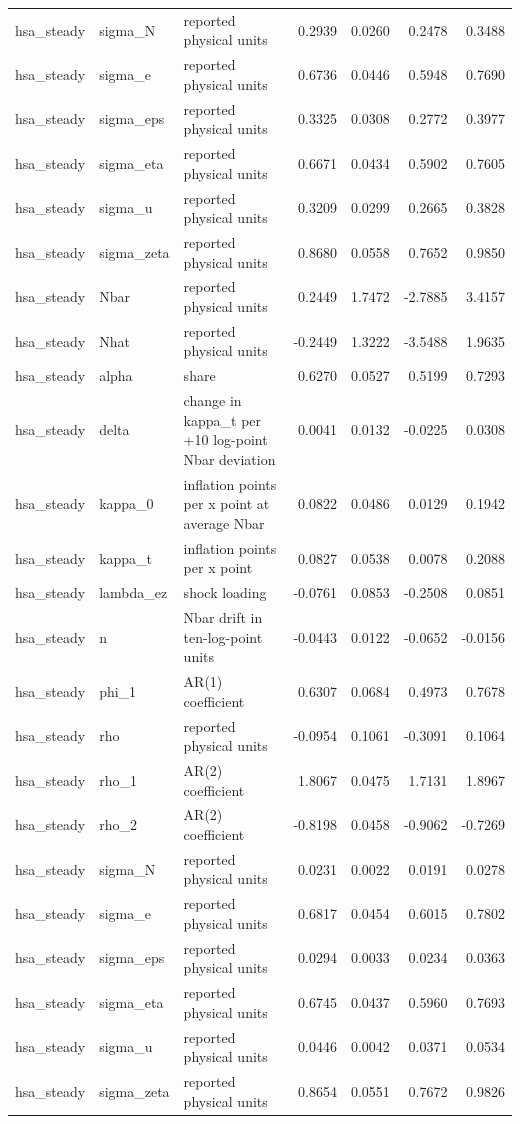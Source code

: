 \begin{tabular}{lllrrrr}
hsa\_steady & sigma\_N & reported physical units & 0.2939 & 0.0260 & 0.2478 & 0.3488 \\
hsa\_steady & sigma\_e & reported physical units & 0.6736 & 0.0446 & 0.5948 & 0.7690 \\
hsa\_steady & sigma\_eps & reported physical units & 0.3325 & 0.0308 & 0.2772 & 0.3977 \\
hsa\_steady & sigma\_eta & reported physical units & 0.6671 & 0.0434 & 0.5902 & 0.7605 \\
hsa\_steady & sigma\_u & reported physical units & 0.3209 & 0.0299 & 0.2665 & 0.3828 \\
hsa\_steady & sigma\_zeta & reported physical units & 0.8680 & 0.0558 & 0.7652 & 0.9850 \\
hsa\_steady & Nbar & reported physical units & 0.2449 & 1.7472 & -2.7885 & 3.4157 \\
hsa\_steady & Nhat & reported physical units & -0.2449 & 1.3222 & -3.5488 & 1.9635 \\
hsa\_steady & alpha & share & 0.6270 & 0.0527 & 0.5199 & 0.7293 \\
hsa\_steady & delta & change in kappa\_t per +10 log-point Nbar deviation & 0.0041 & 0.0132 & -0.0225 & 0.0308 \\
hsa\_steady & kappa\_0 & inflation points per x point at average Nbar & 0.0822 & 0.0486 & 0.0129 & 0.1942 \\
hsa\_steady & kappa\_t & inflation points per x point & 0.0827 & 0.0538 & 0.0078 & 0.2088 \\
hsa\_steady & lambda\_ez & shock loading & -0.0761 & 0.0853 & -0.2508 & 0.0851 \\
hsa\_steady & n & Nbar drift in ten-log-point units & -0.0443 & 0.0122 & -0.0652 & -0.0156 \\
hsa\_steady & phi\_1 & AR(1) coefficient & 0.6307 & 0.0684 & 0.4973 & 0.7678 \\
hsa\_steady & rho & reported physical units & -0.0954 & 0.1061 & -0.3091 & 0.1064 \\
hsa\_steady & rho\_1 & AR(2) coefficient & 1.8067 & 0.0475 & 1.7131 & 1.8967 \\
hsa\_steady & rho\_2 & AR(2) coefficient & -0.8198 & 0.0458 & -0.9062 & -0.7269 \\
hsa\_steady & sigma\_N & reported physical units & 0.0231 & 0.0022 & 0.0191 & 0.0278 \\
hsa\_steady & sigma\_e & reported physical units & 0.6817 & 0.0454 & 0.6015 & 0.7802 \\
hsa\_steady & sigma\_eps & reported physical units & 0.0294 & 0.0033 & 0.0234 & 0.0363 \\
hsa\_steady & sigma\_eta & reported physical units & 0.6745 & 0.0437 & 0.5960 & 0.7693 \\
hsa\_steady & sigma\_u & reported physical units & 0.0446 & 0.0042 & 0.0371 & 0.0534 \\
hsa\_steady & sigma\_zeta & reported physical units & 0.8654 & 0.0551 & 0.7672 & 0.9826 \\
\bottomrule
\end{tabular}
